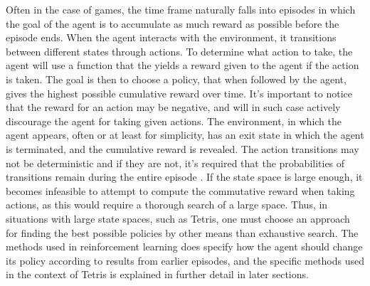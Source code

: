 Often in the case of games, the 
time frame naturally falls into episodes in which the 
goal of the agent is to accumulate as much reward as possible 
before the episode ends. When the agent interacts 
with the environment, it transitions between different states through 
actions. To determine what action to take, the agent will use
a function that the yields a reward given to the agent 
if the action is taken. 
The goal is then to choose a policy, that when followed by the agent,
gives the highest possible cumulative reward over time. 
It's important to notice that the reward 
for an action may be negative, and will in such case actively discourage 
the agent for taking given actions.
The environment, in which the agent appears, often 
or at least for simplicity, has an exit state
in which the agent is terminated, and the cumulative reward 
is revealed. The action transitions may 
not be deterministic and if they are not,
it's required that the probabilities of transitions
remain during the entire episode \citep{Carr}. If the state space 
is large enough, it becomes infeasible to attempt to compute 
the commutative reward when taking actions, as this would require
a thorough search of a large space. Thus, in situations 
with large state spaces, such as Tetris, one must choose 
an approach for finding the best possible policies by other
means than exhaustive search. The methods used in reinforcement learning 
does specify how the agent should change its policy according to 
results from earlier episodes, and the specific methods used in
the context of Tetris is explained in further detail in later sections.













